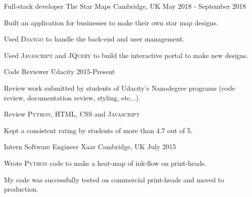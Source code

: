 \begin{cventries}
  \cventry
    {Full-stack developer} %
    {The Star Maps} %
    {Cambridge, UK} %
    {May 2018 - September 2018} %
    {
      \begin{cvitems} %
        \item Built an application for businesses to make their own star map designs.
        \item Used \textsc{Django} to handle the back-end and user management.
        \item Used \textsc{Javascript} and \textsc{JQuery} to build the interactive portal to make new designs.
      \end{cvitems}
    }
  \cventry
    {Code Reviewer} %
    {Udacity} %
    {} %
    { 2015-Present} %
    {
      \begin{cvitems} %
        \item {Review work submitted by students of Udacity's Nanodegree programs (code review, documentation review, styling, etc...).} 
        \item {Review \textsc{Python}, \textsc{HTML}, \textsc{CSS} and \textsc{Javascript}}
        \item {Kept a consistent rating by students of more than 4.7 out of 5.}
      \end{cvitems}
    }
  
  \cventry
    {Intern Software Engineer} %
    {Xaar} %
    {Cambridge, UK} %
    {July 2015} %
    {
      \begin{cvitems} %
        \item{Wrote \textsc{Python} code to make a heat-map of ink-flow on print-heads.}
        \item {My code was successfully tested on commercial print-heads and moved to production.}
      \end{cvitems}
    }

\end{cventries}
